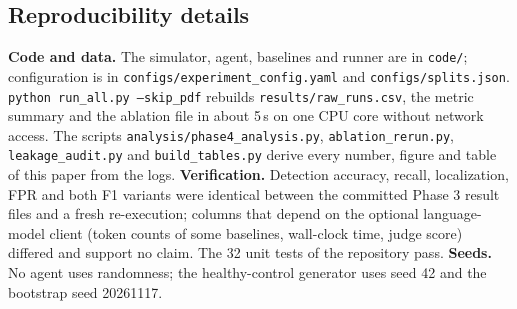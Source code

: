 \documentclass[pdflatex,sn-basic,Numbered,iicol]{sn-jnl}
\begin{document}
\begin{appendices}

\section{Reproducibility details}\label{secA1}
\textbf{Code and data.} The simulator, agent, baselines and runner are in \texttt{code/}; configuration is in \texttt{configs/experiment\_config.yaml} and \texttt{configs/splits.json}. \texttt{python run\_all.py --skip\_pdf} rebuilds \texttt{results/raw\_runs.csv}, the metric summary and the ablation file in about 5\,s on one CPU core without network access. The scripts \texttt{analysis/phase4\_analysis.py}, \texttt{ablation\_rerun.py}, \texttt{leakage\_audit.py} and \texttt{build\_tables.py} derive every number, figure and table of this paper from the logs. \textbf{Verification.} Detection accuracy, recall, localization, FPR and both F1 variants were identical between the committed Phase 3 result files and a fresh re-execution; columns that depend on the optional language-model client (token counts of some baselines, wall-clock time, judge score) differed and support no claim. The 32 unit tests of the repository pass. \textbf{Seeds.} No agent uses randomness; the healthy-control generator uses seed 42 and the bootstrap seed 20261117.


\end{appendices}
\end{document}
